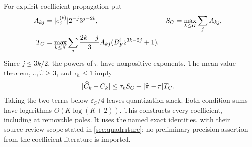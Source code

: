 For explicit coefficient propagation put
\begin{align*}
 A_{kj}&=\lvert e_j^{(k)}\rvert2^{-j}3^{j-2k},&
 S_C&=\max_{k\le K}\sum_jA_{kj},\\
 T_C&=\max_{k\le K}\sum_j\frac{2k-j}{3}A_{kj}
                         (B_F^\sharp2^{3k-2j}+1).
\end{align*}
Since \(j\le3k/2\), the powers of \(\pi\) have nonpositive
exponents. The mean value theorem, \(\pi,\widehat\pi\ge3\), and
\(\tau_h\le1\) imply
\begin{equation}
 \lvert \widehat C_k-C_k\rvert\le\tau_hS_C+
                           \lvert \widehat\pi-\pi\rvert T_C.
 \label{eq:Ck-delivery}
\end{equation}
Taking the two terms below \(\varepsilon_C/4\) leaves quantization
slack. Both condition sums have logarithms \(O(K\log(K+2))\).
This constructs every coefficient, including at removable poles.
It uses the named exact identities, with their source-review scope
stated in \cref{sec:quadrature}; no preliminary precision assertion
from the coefficient literature is imported.
